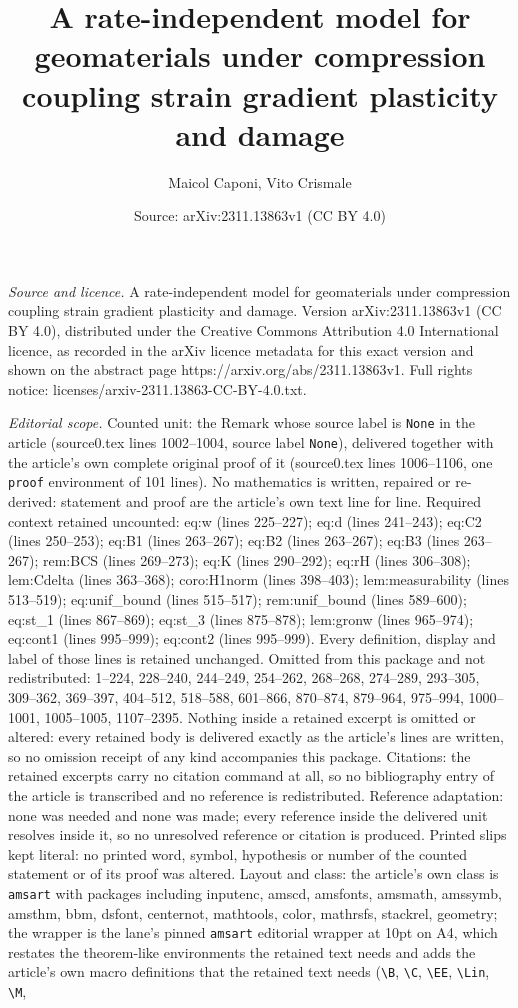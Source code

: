 \documentclass[10pt,a4paper]{amsart}
\title[A rate-independent model for geomaterials under compression ]{A rate-independent model for geomaterials under compression coupling strain gradient plasticity and damage}
\author{Maicol Caponi, Vito Crismale}
\date{Source: arXiv:2311.13863v1 (CC BY 4.0)}
\begin{document}
\maketitle

\noindent\emph{Source and licence.} A rate-independent model for geomaterials under compression coupling strain gradient plasticity and damage. Version arXiv:2311.13863v1 (CC BY 4.0), distributed under the Creative Commons Attribution 4.0 International licence, as recorded in the arXiv licence metadata for this exact version and shown on the abstract page https://arxiv.org/abs/2311.13863v1. Full rights notice: licenses/arxiv-2311.13863-CC-BY-4.0.txt.\par\smallskip

\noindent\textit{Editorial scope.} Counted unit: the Remark whose source label is \texttt{None} in the article (source0.tex lines 1002--1004, source label \texttt{None}), delivered together with the article's own complete original proof of it (source0.tex lines 1006--1106, one \texttt{proof} environment of 101 lines). No mathematics is written, repaired or re-derived: statement and proof are the article's own text line for line. Required context retained uncounted: eq:w (lines 225--227); eq:d (lines 241--243); eq:C2 (lines 250--253); eq:B1 (lines 263--267); eq:B2 (lines 263--267); eq:B3 (lines 263--267); rem:BCS (lines 269--273); eq:K (lines 290--292); eq:rH (lines 306--308); lem:Cdelta (lines 363--368); coro:H1norm (lines 398--403); lem:measurability (lines 513--519); eq:unif\_bound (lines 515--517); rem:unif\_bound (lines 589--600); eq:st\_1 (lines 867--869); eq:st\_3 (lines 875--878); lem:gronw (lines 965--974); eq:cont1 (lines 995--999); eq:cont2 (lines 995--999). Every definition, display and label of those lines is retained unchanged. Omitted from this package and not redistributed: 1--224, 228--240, 244--249, 254--262, 268--268, 274--289, 293--305, 309--362, 369--397, 404--512, 518--588, 601--866, 870--874, 879--964, 975--994, 1000--1001, 1005--1005, 1107--2395. Nothing inside a retained excerpt is omitted or altered: every retained body is delivered exactly as the article's lines are written, so no omission receipt of any kind accompanies this package. Citations: the retained excerpts carry no citation command at all, so no bibliography entry of the article is transcribed and no reference is redistributed. Reference adaptation: none was needed and none was made; every reference inside the delivered unit resolves inside it, so no unresolved reference or citation is produced. Printed slips kept literal: no printed word, symbol, hypothesis or number of the counted statement or of its proof was altered. Layout and class: the article's own class is \texttt{amsart} with packages including inputenc, amscd, amsfonts, amsmath, amssymb, amsthm, bbm, dsfont, centernot, mathtools, color, mathrsfs, stackrel, geometry; the wrapper is the lane's pinned \texttt{amsart} editorial wrapper at 10pt on A4, which restates the theorem-like environments the retained text needs and adds the article's own macro definitions that the retained text needs (\texttt{\textbackslash B}, \texttt{\textbackslash C}, \texttt{\textbackslash EE}, \texttt{\textbackslash Lin}, \texttt{\textbackslash M}, 
\end{document}
